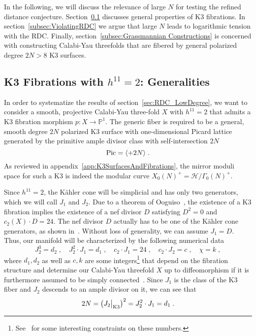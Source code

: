 \documentclass[11pt,a4paper]{article}
\numberwithin{equation}{section}
\numberwithin{table}{section}\setlength{\multlinegap}{25pt}
\begin{document}
In the following, we will discuss the relevance of large $N$ for testing the refined distance conjecture. Section~\ref{subsec:Generalities} discusses general properties of K3 fibrations. In section~\ref{subsec:ViolatingRDC} we argue that large $N$ leads to logarithmic tension with the RDC. Finally, section~\ref{subsec:Grassmannian Constructions} is concerned with constructing Calabi-Yau threefolds that are fibered by general polarized degree $2N>8$ K3 surfaces.

\subsection{K3 Fibrations with \texorpdfstring{$h^{11}=2$}{h11=2}: Generalities}
\label{subsec:Generalities}

In order to systematize the results of section~\ref{sec:RDC_LowDegree}, we want to consider a smooth, projective Calabi-Yau three-fold $X$ with $h^{11}=2$ that admits a K3 fibration morphism $p:X\to\mathbb{P}^1$. The generic fiber is required to be a general, smooth degree $2N$ polarized K3 surface with one-dimensional Picard lattice generated by the primitive ample divisor class with self-intersection $2N$
\begin{equation}
    \textup{Pic}=\langle +2N\rangle\;.
\end{equation}
As reviewed in appendix~\ref{app:K3SurfacesAndFibrations}, the mirror moduli space for such a K3 is indeed the modular curve $X_0(N)^+=\mathcal{H}/\Gamma_0(N)^+$.

Since $h^{11}=2$, the Kähler cone will be simplicial and has only two generators, which we will call $J_1$ and $J_2$. Due to a theorem of Ooguiso~\cite{Oguiso1,Oguiso2}, the existence of a K3 fibration implies the existence of a nef divisor $D$ satisfying $D^2=0$ and $c_2(X)\cdot D=24$. The nef divisor $D$ actually has to be one of the Kähler cone generators, as shown in~\cite{Lee:2019wij}. Without loss of generality, we can assume $J_1=D$. Thus, our manifold will be characterized by the following numerical data
\begin{equation}
    \label{eq:IntersectionsGeneral}
    J_2^3=d_2\;,\quad J_2^2\cdot J_1=d_1\;,\quad c_2\cdot J_1=24\;,\quad c_2\cdot J_2=c\;,\quad \chi=k\;,
\end{equation}
where $d_1,d_2$ as well as $c,k$ are some integers\footnote{See~\cite{Kanazawa2014} for some interesting constraints on these numbers.} that depend on the fibration structure and determine our Calabi-Yau threefold $X$ up to diffeomorphism if it is furthermore assumed to be simply connected~\cite{Wall1966}. Since $J_1$ is the class of the K3 fiber and $J_2$ descends to an ample divisor on it, we can see that
\begin{equation}
    2N=\left(J_2\big|_\textup{K3}\right)^2=J_2^2\cdot J_1=d_1\;.
\end{equation}
\end{document}
